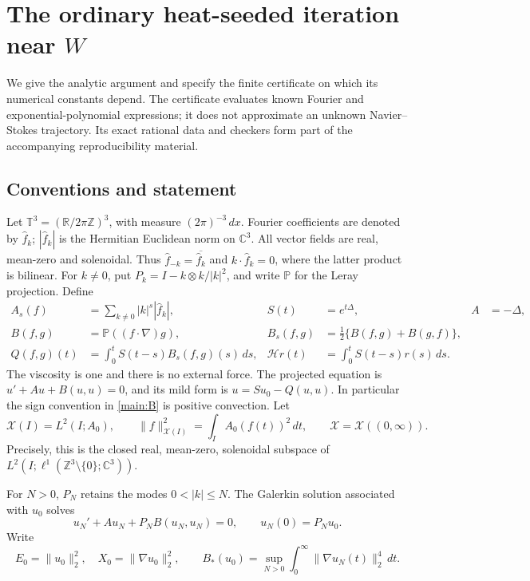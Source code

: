 \section{The ordinary heat-seeded iteration near \texorpdfstring{$W$}{W}}
\label{main:section}

We give the analytic argument and specify the finite certificate on which its
numerical constants depend. The certificate evaluates known Fourier and
exponential-polynomial expressions; it does not approximate an unknown
Navier--Stokes trajectory. Its exact rational data and checkers form part of
the accompanying reproducibility material.

\subsection{Conventions and statement}
\label{main:conventions}

Let $\mathbb T^3=(\mathbb R/2\pi\mathbb Z)^3$, with measure
$(2\pi)^{-3}\,dx$. Fourier coefficients are denoted by $\widehat f_k$;
$|\widehat f_k|$ is the Hermitian Euclidean norm on $\mathbb C^3$.
All vector fields are real, mean-zero and solenoidal. Thus
$\widehat f_{-k}=\overline{\widehat f_k}$ and
$k\cdot\widehat f_k=0$, where the latter product is bilinear.
For $k\ne0$, put $P_k=I-k\otimes k/|k|^2$, and write $\mathbb P$ for the
Leray projection. Define
\begin{align}
 A_s(f)&=\sum_{k\ne0}|k|^s|\widehat f_k|,
 & S(t)&=e^{t\Delta}, & A&=-\Delta,\label{main:norms}\\
 B(f,g)&=\mathbb P((f\cdot\nabla)g),
 &B_s(f,g)&=\tfrac12\{B(f,g)+B(g,f)\},\label{main:B}\\
 Q(f,g)(t)&=\int_0^t S(t-s)B_s(f,g)(s)\,ds,
 &\mathcal H r(t)&=\int_0^t S(t-s)r(s)\,ds.\label{main:Q}
\end{align}
The viscosity is one and there is no external force. The projected equation
is $u'+Au+B(u,u)=0$, and its mild form is $u=Su_0-Q(u,u)$.
In particular the sign convention in \eqref{main:B} is positive convection.
Let
\begin{equation}
 \mathcal X(I)=L^2(I;A_0),\qquad
 \|f\|_{\mathcal X(I)}^2=\int_I A_0(f(t))^2\,dt,
 \qquad \mathcal X=\mathcal X((0,\infty)).\label{main:X}
\end{equation}
Precisely, this is the closed real, mean-zero, solenoidal subspace of
$L^2(I;\ell^1(\mathbb Z^3\setminus\{0\};\mathbb C^3))$.

For $N>0$, $P_N$ retains the modes $0<|k|\le N$. The Galerkin solution
associated with $u_0$ solves
\begin{equation}
 u_N'+Au_N+P_NB(u_N,u_N)=0,\qquad u_N(0)=P_Nu_0.\label{main:galerkin}
\end{equation}
Write
\begin{equation}
 E_0=\|u_0\|_2^2,\quad X_0=\|\nabla u_0\|_2^2,\qquad
 B_*(u_0)=\sup_{N>0}\int_0^\infty\|\nabla u_N(t)\|_2^4\,dt.
 \label{main:Bstar}
\end{equation}

